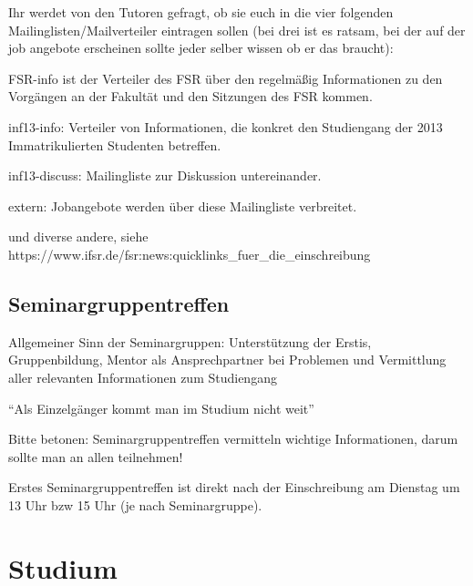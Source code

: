 \documentclass[a4paper,12pt]{report}
\begin{document}
\begin{itemize*}
\begin{itemize*}
\end{itemize*}
\item Ihr werdet von den Tutoren gefragt, ob sie euch in die vier folgenden Mailinglisten/Mailverteiler eintragen sollen (bei drei ist es ratsam, bei der auf der job angebote erscheinen sollte jeder selber wissen ob er das braucht):
\begin{itemize*}
\item FSR-info ist der Verteiler des FSR über den regelmäßig Informationen zu den Vorgängen an der Fakultät und den Sitzungen des FSR kommen.
\item inf13-info: Verteiler von Informationen, die konkret den Studiengang der 2013 Immatrikulierten Studenten betreffen.
\item inf13-discuss: Mailingliste zur Diskussion untereinander.
\item extern: Jobangebote werden über diese Mailingliste verbreitet.
\item und diverse andere, siehe https://www.ifsr.de/fsr:news:quicklinks\_fuer\_die\_einschreibung
\end{itemize*}
\end{itemize*}

\subsection{Seminargruppentreffen}
\begin{itemize*}
\item Allgemeiner Sinn der Seminargruppen: Unterstützung der Erstis, Gruppenbildung, Mentor als Ansprechpartner bei Problemen und Vermittlung aller relevanten Informationen zum Studiengang 
\item "`Als Einzelgänger kommt man im Studium nicht weit"'
\item Bitte betonen: Seminargruppentreffen vermitteln wichtige Informationen, darum sollte man an allen teilnehmen!
\item Erstes Seminargruppentreffen ist direkt nach der Einschreibung am Dienstag um 13 Uhr bzw 15 Uhr (je nach Seminargruppe).

\end{itemize*}

\section{Studium}
\end{document}
